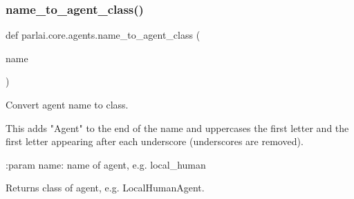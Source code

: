 \subsubsection{\texorpdfstring{name\+\_\+to\+\_\+agent\+\_\+class()}{name\_to\_agent\_class()}}
{\footnotesize\ttfamily def parlai.\+core.\+agents.\+name\+\_\+to\+\_\+agent\+\_\+class (\begin{DoxyParamCaption}\item[{}]{name }\end{DoxyParamCaption})}

\begin{DoxyVerb}Convert agent name to class.

This adds "Agent" to the end of the name and uppercases the first letter
and the first letter appearing after each underscore (underscores are
removed).

:param name: name of agent, e.g. local_human

Returns class of agent, e.g. LocalHumanAgent.
\end{DoxyVerb}
 